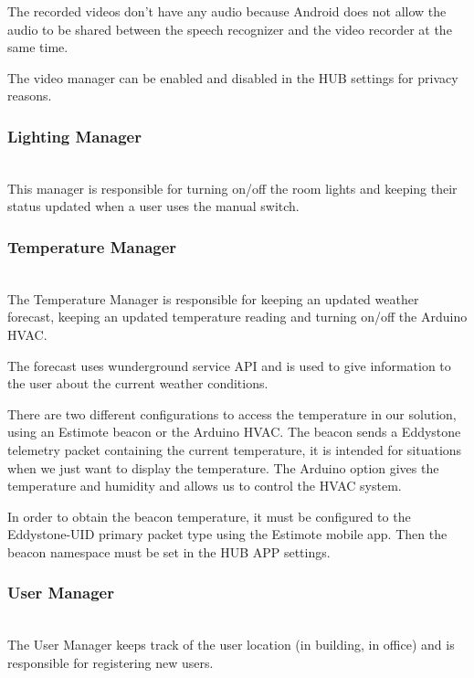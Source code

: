 The recorded videos don't have any audio because Android does not allow the audio to be shared between the speech recognizer and the video recorder at the same time.

The video manager can be enabled and disabled in the HUB settings for privacy reasons.



\subsubsection{Lighting Manager}\mbox{}\\

This manager is responsible for turning on/off the room lights and keeping their status updated when a user uses the manual switch. 






\subsubsection{Temperature Manager}\label{temperature_manager_imp}\mbox{}\\


The Temperature Manager is responsible for keeping an updated weather forecast, keeping an updated temperature reading and turning on/off the Arduino \ac{HVAC}.

The forecast uses wunderground service API and is used to give information to the user about the current weather conditions.

There are two different configurations to access the temperature in our solution, using an Estimote beacon or the Arduino \ac{HVAC}. 
The beacon sends a Eddystone telemetry packet containing the current temperature, it is intended for situations when we just want to display the temperature.
The Arduino option gives the temperature and humidity and allows us to control the \ac{HVAC} system.


In order to obtain the beacon temperature, it must be configured to the Eddystone-UID primary packet type using the Estimote mobile app. Then the beacon namespace must be set in the HUB APP settings.


\subsubsection{User Manager}\mbox{}\\


The User Manager keeps track of the user location (in building, in office) and is responsible for registering new users.

